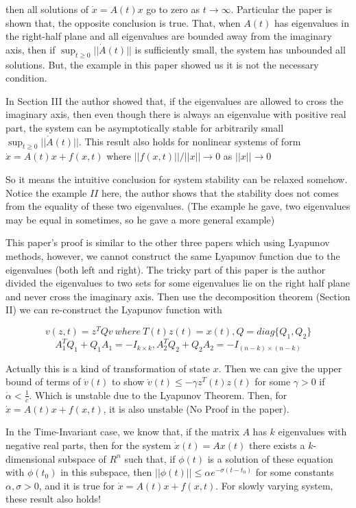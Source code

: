 \documentclass{article}
\begin{document}
then all solutions of $\dot{x}=A(t)x$ go to zero as $t \rightarrow \infty$. Particular the paper is shown that, the opposite conclusion is true. That, when $A(t)$ has eigenvalues in the right-half plane and all eigenvalues are bounded away from the imaginary axis, then if $\sup_{t \ge 0}||\dot{A}(t)||$ is sufficiently small, the system has unbounded all solutions. But, the example in this paper showed us it is not the necessary condition. 

In Section III the author showed that, if the eigenvalues are allowed to cross the imaginary axis, then even though there is always an eigenvalue with positive real part, the system can be asymptotically stable for arbitrarily
small $\sup_{t \ge 0} ||\dot{A}(t)||$. This result also holds for nonlinear systems of form $\dot{x} = A(t)x + f(x,t)$ where $||f(x,t)||/||x|| \longrightarrow 0$ as $||x|| \longrightarrow 0$

So it means the intuitive conclusion for system stability can be relaxed somehow. Notice the example $II$ here, the author shows that the stability does not comes from the equality of these two eigenvalues. (The example he gave, two eigenvalues may be equal in sometimes, so he gave a more general example)

This paper's proof is similar to the other three papers which using Lyapunov methods, however, we cannot construct the same Lyapunov function due to the eigenvalues (both left and right). The tricky part of this paper is the author divided the eigenvalues to two sets for some eigenvalues lie on the right half plane and never cross the imaginary axis. Then use the decomposition theorem (Section II) we can re-construct the Lyapunov function with 

$$v(z,t)=z^T Q v \ where \ T(t)z(t)=x(t), Q = diag\{Q_1,Q_2\}$$
$$A_1^T Q_1 + Q_1 A_1 = -I_{k \times k}, A_2^T Q_2 + Q_2 A_2 = -I_{(n-k) \times (n-k)}$$ 

Actually this is a kind of transformation of state $x$. Then we can give the upper bound of terms of $\dot{v}(t)$ to show $\dot{v}(t) \leq -\gamma z^T(t) z(t)$ for some $\gamma > 0$ if $\dot{\alpha} < \frac{1}{c}$. Which is unstable due to the Lyapunov Theorem. Then, for $\dot{x} = A(t)x + f(x,t)$, it is also unstable (No Proof in the paper).

In the Time-Invariant case, we know that, if the matrix $A$ has $k$ eigenvalues with negative real parts, then for the system $\dot{x}(t) = Ax(t)$ there exists a $k$-dimensional subspace of $R^n$ such that, if $\phi(t)$ is a solution of these equation with $\phi(t_0)$ in this subspace, then $||\phi(t)|| \leq \alpha e^{-\sigma(t-t_0)}$ for some constants $\alpha,\sigma > 0$, and it is true for $\dot{x} = A(t)x + f(x,t)$. For slowly varying system, these result also holds!
\end{document}
